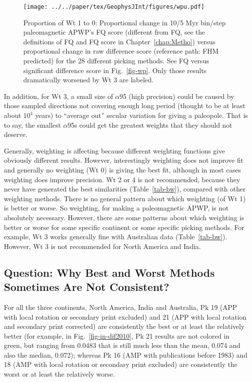 \begin{figure}
\centering
\texttt{[image: ../../paper/tex/GeophysJInt/figures/wpu.pdf]}
\caption[Proportional changes of Wt 1 to 0: Paleomagnetic
APWP's FQ score vs raw difference score]{Proportion of Wt
1 to 0: Proportional change in 10/5 Myr bin/step paleomagnetic
APWP's FQ score (different from FQ, see the definitions of FQ and FQ score in
Chapter~\ref{chap:Metho}) versus proportional change in raw difference score (reference path:
FHM predicted) for the 28 different picking methods. See FQ versus significant
difference score in Fig.~\ref{fig-wp}. Only those results dramatically worsened
by Wt 3 are labeled.}\label{fig-wpu}
\end{figure}

In addition, for Wt 3, a small size of $\alpha$95 (high precision) could be
caused by those sampled directions not covering enough long period (thought to
be at least about $10^4$ years) to ``average out'' secular variation for giving
a paleopole. That is to say, the smallest $\alpha$95s could get the greatest
weights that they should not deserve.

Generally, weighting is affecting because different weighting functions give
obviously different results. However, interestingly weighting does not improve
fit and generally no weighting (Wt 0) is giving the best fit, although in most
cases weighting does improve precision. Wt 2 or 4 is not recommended, because
they never have generated the best similarities (Table~\ref{tab-bw}), compared
with other weighting methods. There is no general pattern about which weighting
(of Wt 1) is better or worse. So weighting, for making a
paleomagnetic APWP, is not absolutely necessary. However, there are some
patterns about which weighting is better or worse for some specific continent or
some specific picking methods. For example, Wt 3 works generally fine with
Australian data (Table~\ref{tab-bw}). However, Wt 3 is not recommended for North
America and India.

\subsection{Question: Why Best and Worst Methods Sometimes Are Not Consistent?}

For all the three continents, North America, India and Australia, Pk
19 (APP with local rotation or secondary print excluded) and 21 (APP
with local rotation and secondary print corrected) are consistently the best or
at least the relatively better (for example, in Fig.~\ref{fig-in-dif2010},
Pk 21 results are not colored in green, but ranging from
0.0483 that is still much less than the mean, 0.074 and also
the median, 0.072); whereas Pk 16 (AMP with publications before
1983) and 18 (AMP with local rotation or secondary print excluded) are
consistently the worst or at least the relatively worse.

